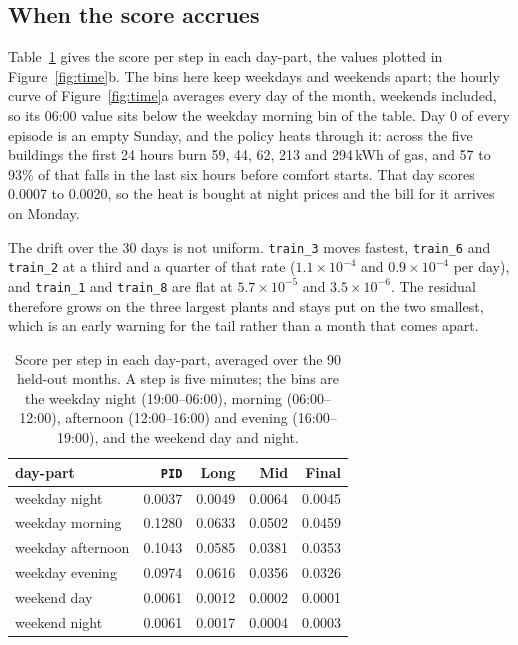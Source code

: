 \documentclass{article}
\begin{document}
\subsection{When the score accrues}

Table~\ref{tab:app_daypart} gives the score per step in each day-part, the values plotted in Figure~\ref{fig:time}b. The bins here keep weekdays and weekends apart; the hourly curve of Figure~\ref{fig:time}a averages every day of the month, weekends included, so its 06:00 value sits below the weekday morning bin of the table. Day 0 of every episode is an empty Sunday, and the policy heats through it: across the five buildings the first 24 hours burn 59, 44, 62, 213 and 294\,kWh of gas, and 57 to 93\% of that falls in the last six hours before comfort starts. That day scores 0.0007 to 0.0020, so the heat is bought at night prices and the bill for it arrives on Monday.

The drift over the 30 days is not uniform. \texttt{train\_3} moves fastest, \texttt{train\_6} and \texttt{train\_2} at a third and a quarter of that rate ($1.1\times10^{-4}$ and $0.9\times10^{-4}$ per day), and \texttt{train\_1} and \texttt{train\_8} are flat at $5.7\times10^{-5}$ and $3.5\times10^{-6}$. The residual therefore grows on the three largest plants and stays put on the two smallest, which is an early warning for the tail rather than a month that comes apart.

\begin{table}[h!]
\centering
\small
\begin{tabular}{@{}lrrrr@{}}
\toprule
day-part & \texttt{PID} & Long & Mid & Final \\
\midrule
weekday night & 0.0037 & 0.0049 & 0.0064 & 0.0045 \\
weekday morning & 0.1280 & 0.0633 & 0.0502 & 0.0459 \\
weekday afternoon & 0.1043 & 0.0585 & 0.0381 & 0.0353 \\
weekday evening & 0.0974 & 0.0616 & 0.0356 & 0.0326 \\
weekend day & 0.0061 & 0.0012 & 0.0002 & 0.0001 \\
weekend night & 0.0061 & 0.0017 & 0.0004 & 0.0003 \\
\bottomrule
\end{tabular}
\vspace{4pt}
\caption{Score per step in each day-part, averaged over the 90 held-out months. A step is five
minutes; the bins are the weekday night (19:00--06:00), morning (06:00--12:00), afternoon
(12:00--16:00) and evening (16:00--19:00), and the weekend day and night.}
\label{tab:app_daypart}
\end{table}
\end{document}
